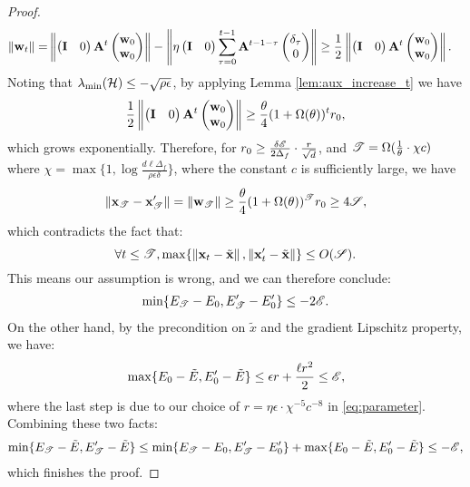 \begin{proof}
\begin{align*}
\left\|{\mathbf{w}_t}\right\| =& \left\|{\begin{pmatrix} \mathbf{I} & 0 \end{pmatrix}\mathbf{A}^{t}\begin{pmatrix} \mathbf{w}_0 \\ \mathbf{w}_{0} \end{pmatrix} }\right\|
-\left\|{\eta\begin{pmatrix} \mathbf{I} & 0 \end{pmatrix}\sum_{\tau = 0}^{t-1} \mathbf{A}^{t-1-\tau}\begin{pmatrix}  \delta_\tau \\ 0 \end{pmatrix} }\right\|
\ge \frac{1}{2}\left\|{\begin{pmatrix} \mathbf{I} & 0 \end{pmatrix}\mathbf{A}^{t}\begin{pmatrix} \mathbf{w}_0 \\ \mathbf{w}_{0} \end{pmatrix} }\right\|.
\end{align*}
Noting that $\lambda_{\min}(\mathcal{H}) \le -\sqrt{\rho\epsilon}$, by applying Lemma \ref{lem:aux_increase_t} we have 
\begin{equation*}
\frac{1}{2}\left\|{\begin{pmatrix} \mathbf{I} & 0 \end{pmatrix}\mathbf{A}^{t}\begin{pmatrix} \mathbf{w}_0 \\ \mathbf{w}_{0} \end{pmatrix}}\right\|
\ge \frac{\theta}{4}(1+ \Omega(\theta))^t r_0,
\end{equation*}
which grows exponentially. Therefore, for  $r_0 \ge \frac{\delta\mathscr{E} }{2\Delta_f}\cdot\frac{r}{\sqrt{d}}$,
and $\mathscr{T} = \Omega(\frac{1}{\theta}\cdot\chi c)$ where $\chi =\max\{1, \log \frac{d \ell\Delta_f}{\rho \epsilon\delta}\}$, where the constant $c$ is sufficiently large, 
we have
$$\left\|{\mathbf{x}_{\mathscr{T}} - \mathbf{x} '_{\mathscr{T}}}\right\| = \left\|{\mathbf{w}_{\mathscr{T}}}\right\| \ge \frac{\theta}{4}(1+ \Omega(\theta))^{\mathscr{T}} r_0 \ge 4\mathscr{S},$$
which contradicts the fact that:
\begin{equation*}
\forall t \le \mathscr{T}, \max\{\left\|{\mathbf{x}_t - \tilde{\mathbf{x}}}\right\|,  \left\|{\mathbf{x} '_t - \tilde{\mathbf{x}}}\right\|\} \le O(\mathscr{S}).
\end{equation*}
This means our assumption is wrong, and we can therefore conclude:
\begin{align*}
\min\{E_{\mathscr{T}} -E_0, E '_{\mathscr{T}} - E '_0\} \le - 2\mathscr{E}.
\end{align*}
On the other hand, by the precondition on $\tilde{x}$ and the gradient Lipschitz
property, we have:
\begin{align*}
\max\{E_0 - \tilde{E}, E '_0- \tilde{E}\}
\le \epsilon r + \frac{\ell r^2}{2} \le \mathscr{E},
\end{align*}
where the last step is due to our choice of $r= \eta\epsilon\cdot \chi^{-5}c^{-8}$ 
in \eqref{eq:parameter}.  Combining these two facts:
\begin{align*}
\min\{E_{\mathscr{T}} -\tilde{E}, E '_{\mathscr{T}} - \tilde{E}\}
\le \min\{E_{\mathscr{T}} -E_0, E '_{\mathscr{T}} - E '_0\} +
\max\{E_0 - \tilde{E}, E '_0- \tilde{E}\} \le -\mathscr{E},
\end{align*}
which finishes the proof.
\end{proof}

